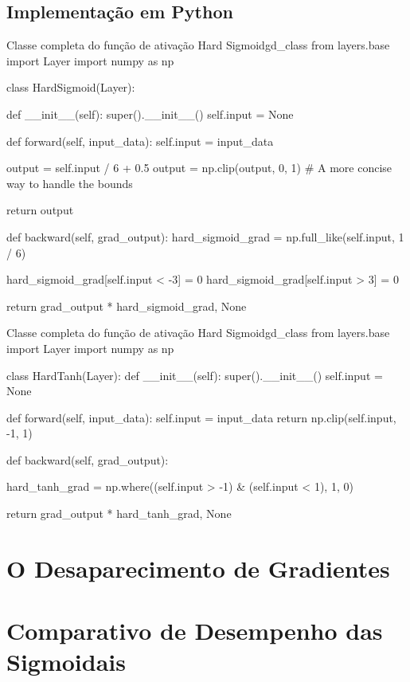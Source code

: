 \subsection{Implementação em Python}

\begin{codelisting}{Classe completa do função de ativação Hard Sigmoid}{gd_class}
from layers.base import Layer
import numpy as np

class HardSigmoid(Layer):

    def __init__(self):
        super().__init__()
        self.input = None

    def forward(self, input_data):
        self.input = input_data

        output = self.input / 6 + 0.5
        output = np.clip(output, 0, 1)  # A more concise way to handle the bounds

        return output

    def backward(self, grad_output):
        hard_sigmoid_grad = np.full_like(self.input, 1 / 6)

        hard_sigmoid_grad[self.input < -3] = 0
        hard_sigmoid_grad[self.input > 3] = 0

        return grad_output * hard_sigmoid_grad, None
\end{codelisting}

\begin{codelisting}{Classe completa do função de ativação Hard Sigmoid}{gd_class}
from layers.base import Layer
import numpy as np


class HardTanh(Layer):
    def __init__(self):
        super().__init__()
        self.input = None

    def forward(self, input_data):
        self.input = input_data
        return np.clip(self.input, -1, 1)

    def backward(self, grad_output):

        hard_tanh_grad = np.where((self.input > -1) & (self.input < 1), 1, 0)

        return grad_output * hard_tanh_grad, None
\end{codelisting}

\section{O Desaparecimento de Gradientes}

\section{Comparativo de Desempenho das Sigmoidais}